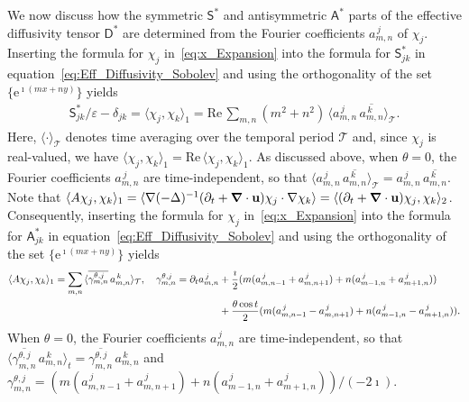 \documentclass{article}
\newcommand{\Real}{\mbox{Re}\,}
\newcommand{\e}{\mathrm{e}}
\newcommand\bnabla{\mbox{\boldmath${\nabla}$}}
\newcommand{\Tc}{\mathcal{T}}
\newcommand{\Sm}{\mathsf{S}}
\newcommand{\Am}{\mathsf{A}}
\newcommand{\Dm}{\mathsf{D}}
\newcommand{\vecu}{\mathbf{u}}
\begin{document}
We now discuss how the symmetric $\Sm^*$ and antisymmetric $\Am^*$ parts
of the effective diffusivity tensor $\Dm^*$ are determined from the
Fourier coefficients $a^{\,j}_{m,n}$ of $\chi_j$. Inserting the formula
for $\chi_j$ in~\eqref{eq:x_Expansion} into the formula for $\Sm^*_{jk}$ in
equation~\eqref{eq:Eff_Diffusivity_Sobolev} and using the
orthogonality of  the set $\{\e^{\imath(mx+ny)}\}$ yields 
%
\begin{align}
 \Sm^*_{jk}/\varepsilon-\delta_{jk}= \langle\chi_j,\chi_k\rangle_1=\Real\sum_{m,n}(m^2+n^2)\,\langle a^{\,j}_{m,n}\,\overline{a^{\,k}_{m,n}}\rangle_{\Tc}.
\end{align} 
%
Here, $\langle\cdot\rangle_{\Tc}$ denotes time averaging over the temporal period
$\Tc$ and, since $\chi_j$ 
is real-valued, we have $\langle\chi_j,\chi_k\rangle_1=\Real\langle\chi_j,\chi_k\rangle_1$.
As discussed above, when $\theta=0$, the Fourier coefficients
$a^{\,j}_{m,n}$ are time-independent, so that
$\langle a^{\,j}_{m,n}\,\overline{a^{\,k}_{m,n}}\rangle_{\Tc}=a^{\,j}_{m,n}\,\overline{a^{\,k}_{m,n}}$. Note
that
$\langle
A\chi_j,\chi_k\rangle_1=\langle\nabla(-\Delta)^{-1}(\partial_t+\bnabla\cdot\vecu)\chi_j\cdot\nabla\chi_k\rangle=\langle(\partial_t+\bnabla\cdot\vecu)\chi_j,\chi_k\rangle_2$. Consequently,
inserting the formula
for $\chi_j$ in~\eqref{eq:x_Expansion} into the formula for $\Am^*_{jk}$ in
equation~\eqref{eq:Eff_Diffusivity_Sobolev} and using the
orthogonality of  the set $\{\e^{\imath(mx+ny)}\}$ yields 
%
\begin{align}
  \langle A\chi_j,\chi_k\rangle_1=\sum_{m,n}\,\langle\overline{\gamma_{m,n}^{\theta,j}}\,a^{\,k}_{m,n}\rangle_{\Tc},\quad
  \gamma_{m,n}^{\theta,j}=\partial_ta^{\,j}_{m,n}
    &+\frac{\imath}{2}(m(a^{\,j}_{m,n-1}+a^{\,j}_{m,n+1})+n(a^{\,j}_{m-1,n}+a^{\,j}_{m+1,n}))
    \\
    &+\frac{\theta\cos{t}}{2}(m(a^{\,j}_{m,n-1}-a^{\,j}_{m,n+1})+n(a^{\,j}_{m-1,n}-a^{\,j}_{m+1,n})).
  \notag
\end{align}
%
When $\theta=0$, the Fourier coefficients $a^{\,j}_{m,n}$ are 
time-independent, so that
$\langle\overline{\gamma^{\theta,j}_{m,n}}\,a^{\,k}_{m,n}\rangle_t=\overline{\gamma^{\theta,j}_{m,n}}\,a^{\,k}_{m,n}$ and
$\gamma_{m,n}^{\theta,j}=(m(a^{\,j}_{m,n-1}+a^{\,j}_{m,n+1})+n(a^{\,j}_{m-1,n}+a^{\,j}_{m+1,n}))/(-2\imath)$.
\end{document}
